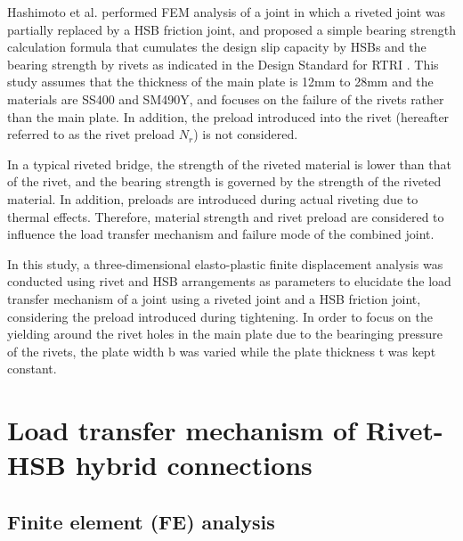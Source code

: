 Hashimoto et al. \cite{hashimoto2008} performed FEM analysis of a joint in which a riveted joint was partially replaced by a \ac{HSB} friction joint, and proposed a simple bearing strength calculation formula that cumulates the design slip capacity by \ac{HSB}s and the bearing strength by rivets as indicated in the Design Standard for \ac{RTRI} \cite{rtri2009Design}. This study assumes that the thickness of the main plate is 12mm to 28mm and the materials are SS400 and SM490Y, and focuses on the failure of the rivets rather than the main plate. In addition, the preload introduced into the rivet (hereafter referred to as the rivet preload $N_r$) is not considered.

In a typical riveted bridge, the strength of the riveted material is lower than that of the rivet, and the bearing strength is governed by the strength of the riveted material. In addition, preloads are introduced during actual riveting due to thermal effects. Therefore, material strength and rivet preload are considered to influence the load transfer mechanism and failure mode of the combined joint.

In this study, a three-dimensional elasto-plastic finite displacement analysis was conducted using rivet and \ac{HSB} arrangements as parameters to elucidate the load transfer mechanism of a joint using a riveted joint and a \ac{HSB} friction joint, considering the preload introduced during tightening. In order to focus on the yielding around the rivet holes in the main plate due to the bearinging pressure of the rivets, the plate width b was varied while the plate thickness t was kept constant.

\section{Load transfer mechanism of Rivet-HSB hybrid connections}

\subsection{Finite element (FE) analysis}
\label{ch4sec2}

